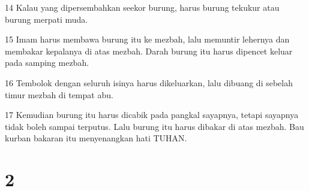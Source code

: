 \par 14 Kalau yang dipersembahkan seekor burung, harus burung tekukur atau burung merpati muda.
\par 15 Imam harus membawa burung itu ke mezbah, lalu memuntir lehernya dan membakar kepalanya di atas mezbah. Darah burung itu harus dipencet keluar pada samping mezbah.
\par 16 Tembolok dengan seluruh isinya harus dikeluarkan, lalu dibuang di sebelah timur mezbah di tempat abu.
\par 17 Kemudian burung itu harus dicabik pada pangkal sayapnya, tetapi sayapnya tidak boleh sampai terputus. Lalu burung itu harus dibakar di atas mezbah. Bau kurban bakaran itu menyenangkan hati TUHAN.

\chapter{2}

